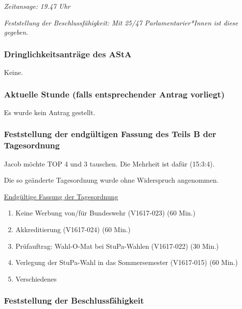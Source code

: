 \documentclass[ngerman,headheight=70pt]{scrartcl}
\begin{document}
    \textit{Zeitansage: 19.47 Uhr}

    \textit{Feststellung der Beschlussfähigkeit: Mit 25/47 Parlamentarier*Innen
    ist diese gegeben.}

    \subsubsection{Dringlichkeitsanträge des AStA}

    Keine.

    \subsubsection{Aktuelle Stunde (falls entsprechender Antrag vorliegt)}

    Es wurde kein Antrag gestellt.

    \subsubsection{Feststellung der endgültigen Fassung des Teils B der Tagesordnung}

    Jacob möchte TOP 4 und 3 tauschen. Die Mehrheit ist dafür (15:3:4).

    Die so geänderte Tagesordnung wurde ohne Widerspruch angenommen.

    \underline{Endgültige Fassung der Tagesordnung}
    \begin{enumerate}[label={\textbf{Top \theenumi}},leftmargin=*]
        \item Keine Werbung von/für Bundeswehr (V1617-023) (60 Min.)
        \item Akkreditierung (V1617-024) (60 Min.)
        \item Prüfauftrag: Wahl-O-Mat bei StuPa-Wahlen (V1617-022) (30 Min.)
        \item Verlegung der StuPa-Wahl in das Sommersemester (V1617-015) (60 Min.)
        \item Verschiedenes
    \end{enumerate}

    \subsubsection{Feststellung der Beschlussfähigkeit}
\end{document}

